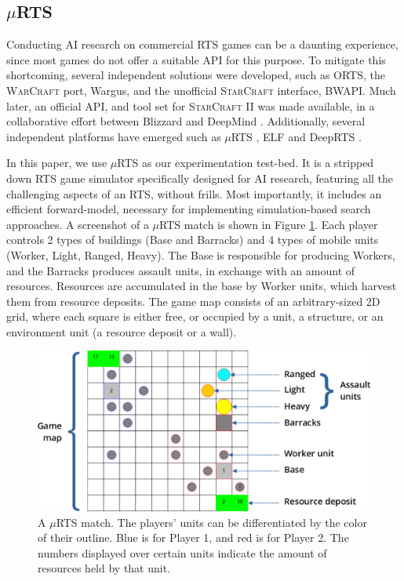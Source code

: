 \documentclass[conference]{IEEEtran}
\newcommand{\mRTS}{$\mu$RTS}
\begin{document}

\subsection{\mRTS{}}

Conducting AI research on commercial RTS games can be a daunting experience, since most games do not offer a suitable API for this purpose. To mitigate this shortcoming, several independent solutions were developed, such as ORTS, the \textsc{WarCraft} port, Wargus, and the unofficial \textsc{StarCraft} interface, BWAPI. Much later, an official API, and tool set for \textsc{StarCraft II} was made available, in a collaborative effort between Blizzard and DeepMind \cite{vinyals_starcraft_2017-1}. Additionally, several independent platforms have emerged such as \mRTS{} \cite{ontanon_combinatorial_2013}, ELF \cite{tian_elf_2017} and DeepRTS \cite{andersen_deep_2018}.

In this paper, we use \mRTS{} as our experimentation test-bed. It is a stripped down RTS game simulator specifically designed for AI research, featuring all the challenging aspects of an RTS, without frills. Most importantly, it includes an efficient forward-model, necessary for implementing simulation-based search approaches. A screenshot of a \mRTS{} match is shown in Figure \ref{mRTSScreenshot}. Each player controls 2 types of buildings (Base and Barracks) and 4 types of mobile units (Worker, Light, Ranged, Heavy). The Base is responsible for producing Workers, and the Barracks produces assault units, in exchange with an amount of resources. Resources are accumulated in the base by Worker units, which harvest them from resource deposits. The game map consists of an arbitrary-sized 2D grid, where each square is either free, or occupied by a unit, a structure, or an environment unit (a resource deposit or a wall).

\begin{figure}[t]
\begin{center}
	\includegraphics[scale=1]{figs/mRTS.png}
	\caption{A \mRTS{} match. The players' units can be differentiated by the color of their outline. Blue is for Player 1, and red is for Player 2. The numbers displayed over certain units indicate the amount of resources held by that unit. }
	\label{mRTSScreenshot}
\end{center}
\end{figure}
\end{document}
